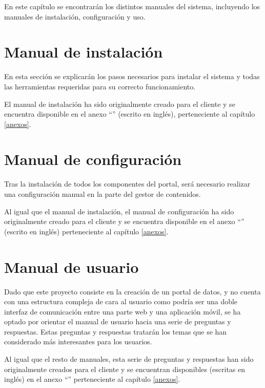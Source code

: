 En este capítulo se encontrarán los distintos manuales del sistema, incluyendo los manuales de instalación, configuración y uso.

\section{Manual de instalación}
En esta sección se explicarán los pasos necesarios para instalar el sistema y todas las herramientas requeridas para su correcto funcionamiento.

El manual de instalación ha sido originalmente creado para el cliente y se encuentra disponible en el anexo ``'' (escrito en inglés), perteneciente al capítulo \ref{anexos}.


\section{Manual de configuración}
Tras la instalación de todos los componentes del portal, será necesario realizar una configuración manual en la parte del gestor de contenidos.

Al igual que el manual de instalación, el manual de configuración ha sido originalmente creado para el cliente y se encuentra disponible en el anexo ``'' (escrito en inglés) perteneciente al capítulo \ref{anexos}.

\section{Manual de usuario}
Dado que este proyecto consiste en la creación de un portal de datos, y no cuenta con una estructura compleja de cara al usuario como podría ser una doble interfaz de comunicación entre una parte web y una aplicación móvil, se ha optado por orientar el manual de usuario hacia una serie de preguntas y respuestas.
Estas preguntas y respuestas tratarán los temas que se han considerado más interesantes para los usuarios.

Al igual que el resto de manuales, esta serie de preguntas y respuestas han sido originalmente creados para el cliente y se encuentran disponibles (escritas en inglés) en el anexo ``'' perteneciente al capítulo \ref{anexos}.